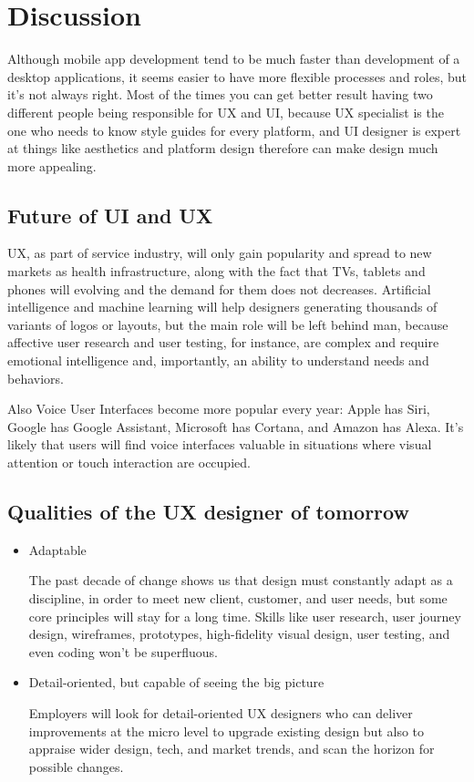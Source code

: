 \documentclass[10pt,twoside,english,a4paper]{article}
\begin{document}
\section{Discussion}
Although mobile app development tend to be much faster than development of a desktop applications, it seems easier to have more flexible processes and roles, but it’s not always right. Most of the times you can get better result having two different people being responsible for UX and UI, because UX specialist is the one who needs to know style guides for every platform, and UI designer is expert at things like aesthetics and platform design therefore can make design much more appealing.
\subsection{Future of UI and UX}
UX, as part of service industry, will only gain popularity and spread to new markets as health infrastructure, along with the fact that TVs, tablets and phones will evolving and the demand for them does not decreases. Artificial intelligence and machine learning will help designers generating thousands of variants of logos or layouts, but the main role will be left behind man, because affective user research and user testing, for instance, are complex and require emotional intelligence and, importantly, an ability to understand needs and behaviors.

Also Voice User Interfaces become more popular every year:  Apple has Siri, Google has Google Assistant, Microsoft has Cortana, and Amazon has Alexa. It’s likely that users will find voice interfaces valuable in situations where visual attention or touch interaction are occupied.
\cite{FutureDesign}
\subsection{Qualities of the UX designer of tomorrow}
\begin{itemize}
\item Adaptable

The past decade of change shows us that design must constantly adapt as a discipline, in order to meet new client, customer, and user needs, but some core principles will stay for a long time. Skills like user research, user journey design, wireframes, prototypes, high-fidelity visual design, user testing, and even coding won't be superfluous.
\item Detail-oriented, but capable of seeing the big picture

Employers will look for detail-oriented UX designers who can deliver improvements at the micro level to upgrade existing design but also to appraise wider design, tech, and market trends, and scan the horizon for possible changes.\cite{DesignerTomorrow}
\end{itemize}
\end{document}
